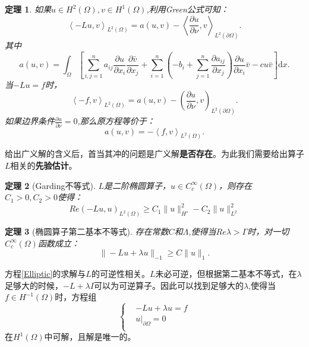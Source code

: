 \documentclass[a4paper]{ctexart}
\newtheorem{Thm}{\hspace{2em}定理}[section]
\newcommand{\dif}{\mathrm{d}}
\newcommand{\pdfFrac}[2]{\frac{\partial #1}{\partial #2}}
\newcommand{\innerprod}[2]{\left<#1,#2\right>}
\begin{document}
\begin{Thm}
    如果$u\in H^{2}(\Omega),v\in H^{1}(\Omega)$,利用Green公式可知：
    \begin{equation}
        \innerprod{-Lu}{v}_{L^{2}(\Omega)}=a(u,v)-\innerprod{\pdfFrac{u}{\nu}}{v}_{L^{2}(\partial\Omega)}.
    \end{equation}
    其中
    \begin{equation}
        a(u,v)=\int_{\Omega}\left[\sum_{i,j=1}^{n}a_{ij}\pdfFrac{u}{x_{i}}\pdfFrac{\bar{v}}{x_{j}}+\sum_{i=1}^{n}\left(-b_{i}+\sum_{j=1}^{n}\pdfFrac{a_{ij}}{x_{j}}\right)\pdfFrac{u}{x_{i}}\bar{v}-cu\bar{v}\right]\dif x.
    \end{equation}
    当$-Lu=f$时，
    \begin{equation}
        \innerprod{-f}{v}_{L^{2}(\Omega)}=a(u,v)-\left(\pdfFrac{u}{\nu},v\right)_{L^{2}(\partial\Omega)}.
    \end{equation}
    如果边界条件$\pdfFrac{u}{\nu}=0$,那么原方程等价于：
    \begin{equation}
        a(u,v)=-\innerprod{f}{v}_{L^{2}(\Omega)}.
    \end{equation}
\end{Thm}

给出广义解的含义后，首当其冲的问题是广义解\textbf{是否存在}。为此我们需要给出算子$L$相关的\textbf{先验估计}。
\begin{Thm}[Garding不等式]
    $L$是二阶椭圆算子，$u\in C_{c}^{\infty}(\Omega)$，则存在$C_{1}>0,C_{2}>0$使得：
    \begin{equation}
        Re(-Lu,u)_{L^{2}(\Omega)}\ge C_{1}\|u\|_{H^{s}}^{2}-C_{2}\|u\|_{L^{2}}^{2}
    \end{equation}
\end{Thm}
\begin{Thm}[椭圆算子第二基本不等式]
    存在常数$C$和$\varLambda$,使得当$Re\lambda>\varGamma$时，对一切$C_{c}^{\infty}(\Omega)$函数成立：
    \begin{equation}
        \|-Lu+\lambda u\|_{-1}\ge C\|u\|_{1}.
    \end{equation}
\end{Thm}
方程\ref{Elliptic}的求解与$L$的可逆性相关。$L$未必可逆，但根据第二基本不等式，在$\lambda$足够大的时候，$-L+\lambda I$可以为可逆算子。因此可以找到足够大的$\lambda$,使得当$f\in H^{-1}(\Omega)$时，方程组
\begin{equation}
    \left\{
        \begin{aligned}
            &-Lu+\lambda u=f\\
            &u|_{\partial\Omega}=0\\
        \end{aligned}
    \right.
\end{equation}
在$H^{1}(\Omega)$中可解，且解是唯一的。
\end{document}
